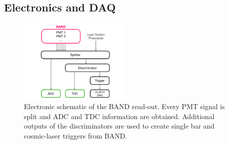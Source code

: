 \documentclass[3p,final,twocolumn]{elsarticle}
\begin{document}
\subsection{Electronics and DAQ}
\begin{figure}[tb]
	\centering
	\includegraphics[width=0.48\textwidth]{electronics-diag.pdf}
	\caption{Electronic schematic of the BAND read-out. Every PMT signal is split and ADC and TDC information are obtained. Additional outputs of the discriminators are used to create single bar and cosmic-laser triggers from BAND.}
	\label{fig:electronic-diag}
\end{figure}
\end{document}
